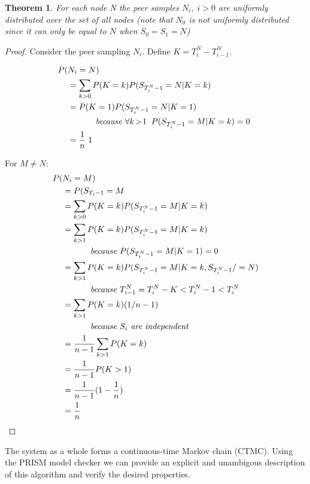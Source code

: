 \documentclass[a4paper,10pt]{article}
\newtheorem*{thm}{Theorem}
\newcommand{\mathins}[1]{\;\;\;\;\;\;\;\;\;\;\;\;\text{\em #1 \em}}
\begin{document}
\begin{thm}For each node N the peer samples $N_i, \; i>0$ are uniformly distributed over the set of all nodes (note that $N_0$ is not uniformly distributed since it can only be equal to $N$ when $S_0 = S_1 = N$)\end{thm}

\begin{proof}
Consider the peer sampling $N_i$. Define $K = T^N_i - T^N_{i-1}$.

\begin{align*}
P(&N_i = N) \\
& = \sum_{k>0} P(K=k) P(S_{T^N_i-1}=N | K=k) \\
& = P(K=1) P(S_{T^N_i-1}=N | K=1) \\
& \mathins{ because $\forall k\!>\!1 \;\; P(S_{T^N_i-1}=M | K=k) = 0$} \\
& = \frac{1}{n} \; 1 \\
\end{align*}

\noindent For $M \neq N$: \\
\begin{align*}
P(&N_i = M) \\
& = P(S_{T_i-1} = M \\
& = \sum_{k>0} P(K=k) P(S_{T^N_i-1}=M | K=k) \\
& = \sum_{k>1} P(K=k) P(S_{T^N_i-1}=M | K=k) \\
& \mathins{ because $P(S_{T^N_i-1}=M | K=1) = 0$} \\
& = \sum_{k>1} P(K=k) P(S_{T^N_i-1}=M | K=k, S_{T^N_i-1} /= N) \\
& \mathins{ because $T^N_{i-1} = T^N_i - K < T^N_i-1 < T^N_i$} \\
& = \sum_{k>1} P(K=k) (1 / n-1) \\
& \mathins{ because $S_i$ are independent} \\
& = \frac{1}{n-1} \sum_{k>1} P(K=k) \\
& = \frac{1}{n-1} P(K>1) \\
& = \frac{1}{n-1} (1 - \frac{1}{n}) \\
& = \frac{1}{n} \\
\end{align*}

\end{proof}

The system as a whole forms a continuous-time Markov chain (CTMC). Using the PRISM model checker we can provide an explicit and unambigous description of this algorithm and verify the desired properties.
\end{document}
